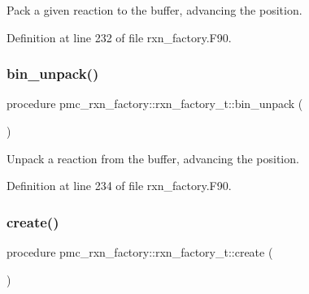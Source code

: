 Pack a given reaction to the buffer, advancing the position. 



Definition at line 232 of file rxn\+\_\+factory.\+F90.

\mbox{\label{structpmc__rxn__factory_1_1rxn__factory__t_a01d9107ebd48bf470251492502354405}} 
\subsubsection{\texorpdfstring{bin\+\_\+unpack()}{bin\_unpack()}}
{\footnotesize\ttfamily procedure pmc\+\_\+rxn\+\_\+factory\+::rxn\+\_\+factory\+\_\+t\+::bin\+\_\+unpack (\begin{DoxyParamCaption}{ }\end{DoxyParamCaption})\hspace{0.3cm}{\ttfamily [private]}}



Unpack a reaction from the buffer, advancing the position. 



Definition at line 234 of file rxn\+\_\+factory.\+F90.

\mbox{\label{structpmc__rxn__factory_1_1rxn__factory__t_acce57e7c7bcdf000102101aefe8d9ade}} 
\subsubsection{\texorpdfstring{create()}{create()}}
{\footnotesize\ttfamily procedure pmc\+\_\+rxn\+\_\+factory\+::rxn\+\_\+factory\+\_\+t\+::create (\begin{DoxyParamCaption}{ }\end{DoxyParamCaption})\hspace{0.3cm}{\ttfamily [private]}}



